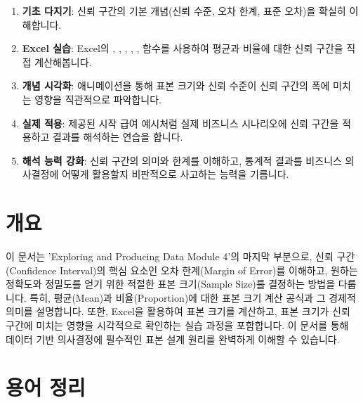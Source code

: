 \documentclass[11pt,a4paper]{article}
\begin{document}
\begin{enumerate}
\begin{enumerate}
\begin{tcolorbox}[title=학습 로드맵: 신뢰 구간 마스터하기, mybox]
    \begin{enumerate}
        \item \textbf{기초 다지기}: 신뢰 구간의 기본 개념(신뢰 수준, 오차 한계, 표준 오차)을 확실히 이해합니다.
        \item \textbf{Excel 실습}: Excel의 , , , , ,  함수를 사용하여 평균과 비율에 대한 신뢰 구간을 직접 계산해봅니다.
        \item \textbf{개념 시각화}: 애니메이션을 통해 표본 크기와 신뢰 수준이 신뢰 구간의 폭에 미치는 영향을 직관적으로 파악합니다.
        \item \textbf{실제 적용}: 제공된 시작 급여 예시처럼 실제 비즈니스 시나리오에 신뢰 구간을 적용하고 결과를 해석하는 연습을 합니다.
        \item \textbf{해석 능력 강화}: 신뢰 구간의 의미와 한계를 이해하고, 통계적 결과를 비즈니스 의사결정에 어떻게 활용할지 비판적으로 사고하는 능력을 기릅니다.
    \end{enumerate}
\end{tcolorbox}

\newpage

\newpage
\section*{개요}
이 문서는 'Exploring and Producing Data Module 4'의 마지막 부분으로, 신뢰 구간(Confidence Interval)의 핵심 요소인 오차 한계(Margin of Error)를 이해하고, 원하는 정확도와 정밀도를 얻기 위한 적절한 표본 크기(Sample Size)를 결정하는 방법을 다룹니다. 특히, 평균(Mean)과 비율(Proportion)에 대한 표본 크기 계산 공식과 그 경제적 의미를 설명합니다. 또한, Excel을 활용하여 표본 크기를 계산하고, 표본 크기가 신뢰 구간에 미치는 영향을 시각적으로 확인하는 실습 과정을 포함합니다. 이 문서를 통해 데이터 기반 의사결정에 필수적인 표본 설계 원리를 완벽하게 이해할 수 있습니다.

\newpage
\section*{용어 정리}


\end{enumerate}
\end{enumerate}
\end{document}
